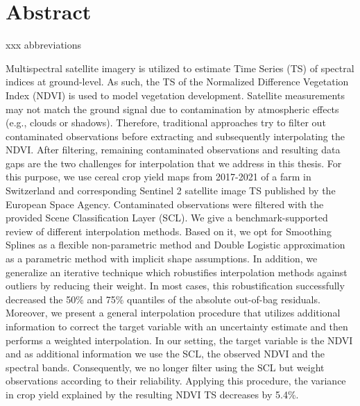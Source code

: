 \chapter*{Abstract}
xxx abbreviations 

Multispectral satellite imagery is utilized to estimate Time Series (TS) of spectral indices at ground-level. As such, the TS of the Normalized Difference Vegetation Index (NDVI) is used to model vegetation development. 
Satellite measurements may not match the ground signal due to contamination by atmospheric effects (e.g., clouds or shadows). Therefore, traditional approaches try to filter out contaminated observations before extracting and subsequently interpolating the NDVI. After filtering, remaining contaminated observations and resulting data gaps are the two challenges for interpolation that we address in this thesis.
For this purpose, we use cereal crop yield maps from 2017-2021 of a farm in Switzerland and corresponding Sentinel 2 satellite image TS published by the European Space Agency. Contaminated observations were filtered with the provided Scene Classification Layer (SCL). 
We give a benchmark-supported review of different interpolation methods. Based on it, we opt for Smoothing Splines as a flexible non-parametric method and Double Logistic approximation as a parametric method with implicit shape assumptions. In addition, we generalize an iterative technique which robustifies interpolation methods against outliers by reducing their weight. In most cases, this robustification successfully decreased the 50\% and 75\% quantiles of the absolute out-of-bag residuals. 
Moreover, we present a general interpolation procedure that utilizes additional information to correct the target variable with an uncertainty estimate and then performs a weighted interpolation. In our setting, the target variable is the NDVI and as additional information we use the SCL, the observed NDVI and the spectral bands. Consequently, we no longer filter using the SCL but weight observations according to their reliability. %
Applying this procedure, the variance in crop yield explained by the resulting NDVI TS decreases by 5.4\%. 




